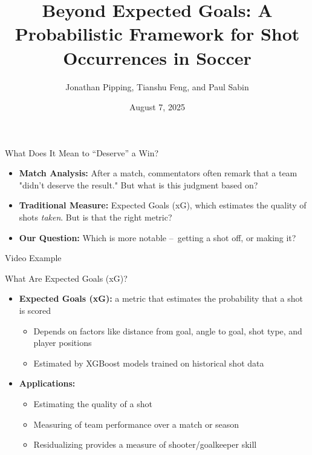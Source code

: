 \documentclass{beamer}
\title[Beyond Expected Goals]{Beyond Expected Goals: A Probabilistic Framework for Shot Occurrences in Soccer}
\author[Pipping, Feng, \& Sabin]{Jonathan Pipping, Tianshu Feng, and Paul Sabin}
\date{August 7, 2025}
\institute[UPenn]{University of Pennsylvania}
\begin{document}
\frame{\titlepage}

\begin{frame}[fragile]{What Does It Mean to ``Deserve'' a Win?}
\begin{itemize}
\item \textbf{Match Analysis:} After a match, commentators often remark that a team "didn't deserve the result." But what is this judgment based on?
\item \textbf{Traditional Measure:} Expected Goals (xG), which estimates the quality of shots \emph{taken}. But is that the right metric?
\item \textbf{Our Question:} Which is more notable – getting a shot off, or making it?
\end{itemize}
\end{frame}

\begin{frame}{Video Example}
\end{frame}

\begin{frame}{What Are Expected Goals (xG)?}
\begin{itemize}
\item \textbf{Expected Goals (xG):} a metric that estimates the probability that a shot is scored
\begin{itemize}
  \item Depends on factors like distance from goal, angle to goal, shot type, and player positions
  \item Estimated by XGBoost models trained on historical shot data
\end{itemize}
\item  \textbf{Applications:}
  \begin{itemize}
  \item Estimating the quality of a shot
  \item Measuring of team performance over a match or season
  \item Residualizing provides a measure of shooter/goalkeeper skill
  \end{itemize}
\end{itemize}
\end{frame}
\end{document}
